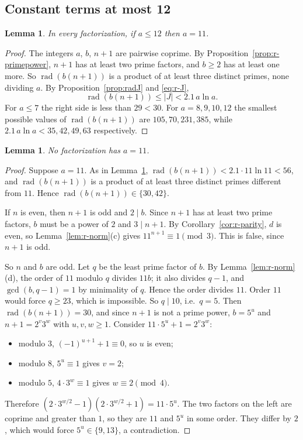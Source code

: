 \documentclass[11pt]{amsart}
\newtheorem{lemma}[theorem]{Lemma}
\theoremstyle{definition}
\theoremstyle{remark}
\numberwithin{equation}{section}
\newcommand{\rad}{\operatorname{rad}}
\begin{document}
\subsection{Constant terms at most 12}\label{ssec:r-small}

\begin{lemma}\label{lem:r-small}
In every factorization, if $a\le12$ then $a=11$.
\end{lemma}

\begin{proof}
The integers $a$, $b$, $n+1$ are pairwise coprime. By
Proposition~\ref{prop:r-primepower}, $n+1$ has at least two prime factors,
and $b\ge2$ has at least one more. So $\rad(b(n+1))$ is a product of at
least three distinct primes, none dividing $a$. By
Proposition~\ref{prop:radJ} and \eqref{eq:r-J},
\[
 \rad(b(n+1))\le|J|<2.1\,a\ln a .
\]
For $a\le7$ the right side is less than $29<30$. For $a=8,9,10,12$ the
smallest possible values of $\rad(b(n+1))$ are $105,70,231,385$, while
$2.1\,a\ln a<35,42,49,63$ respectively.
\end{proof}

\begin{lemma}\label{lem:r-eleven}
No factorization has $a=11$.
\end{lemma}

\begin{proof}
Suppose $a=11$. As in Lemma~\ref{lem:r-small},
$\rad(b(n+1))<2.1\cdot11\ln11<56$, and $\rad(b(n+1))$ is a product of at
least three distinct primes different from $11$. Hence
$\rad(b(n+1))\in\{30,42\}$.

If $n$ is even, then $n+1$ is odd and $2\mid b$. Since $n+1$ has at least
two prime factors, $b$ must be a power of $2$ and $3\mid n+1$. By
Corollary~\ref{cor:r-parity}, $d$ is even, so Lemma~\ref{lem:r-norm}(c)
gives $11^{n+1}\equiv1\pmod3$. This is false, since $n+1$ is odd.

So $n$ and $b$ are odd. Let $q$ be the least prime factor of $b$. By
Lemma~\ref{lem:r-norm}(d), the order of $11$ modulo $q$ divides $11b$; it
also divides $q-1$, and $\gcd(b,q-1)=1$ by minimality of $q$. Hence the
order divides $11$. Order $11$ would force $q\ge23$, which is impossible. So
$q\mid10$, i.e.\ $q=5$. Then $\rad(b(n+1))=30$, and since $n+1$ is not a
prime power, $b=5^u$ and $n+1=2^v3^w$ with $u,v,w\ge1$. Consider
$11\cdot5^u+1=2^v3^w$:
\begin{itemize}
\item modulo $3$, $(-1)^{u+1}+1\equiv0$, so $u$ is even;
\item modulo $8$, $5^u\equiv1$ gives $v=2$;
\item modulo $5$, $4\cdot3^w\equiv1$ gives $w\equiv2\pmod4$.
\end{itemize}
Therefore $(2\cdot3^{w/2}-1)(2\cdot3^{w/2}+1)=11\cdot5^u$. The two factors
on the left are coprime and greater than $1$, so they are $11$ and $5^u$ in
some order. They differ by $2$, which would force $5^u\in\{9,13\}$, a
contradiction.
\end{proof}
\end{document}
